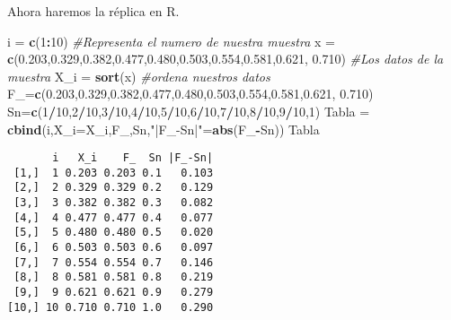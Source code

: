 \documentclass[
  a4paper,
  oneside,
  openany]{book}
\newenvironment{Shaded}{\begin{snugshade}}{\end{snugshade}}
\newcommand{\AttributeTok}[1]{\textcolor[rgb]{0.13,0.29,0.53}{#1}}
\newcommand{\CommentTok}[1]{\textcolor[rgb]{0.56,0.35,0.01}{\textit{#1}}}
\newcommand{\DecValTok}[1]{\textcolor[rgb]{0.00,0.00,0.81}{#1}}
\newcommand{\FloatTok}[1]{\textcolor[rgb]{0.00,0.00,0.81}{#1}}
\newcommand{\FunctionTok}[1]{\textcolor[rgb]{0.13,0.29,0.53}{\textbf{#1}}}
\newcommand{\NormalTok}[1]{#1}
\newcommand{\OtherTok}[1]{\textcolor[rgb]{0.56,0.35,0.01}{#1}}
\newcommand{\SpecialCharTok}[1]{\textcolor[rgb]{0.81,0.36,0.00}{\textbf{#1}}}
\newcommand{\StringTok}[1]{\textcolor[rgb]{0.31,0.60,0.02}{#1}}
\begin{document}
Ahora haremos la réplica en R.

\begin{Shaded}
\begin{Highlighting}[]
\NormalTok{i }\OtherTok{=} \FunctionTok{c}\NormalTok{(}\DecValTok{1}\SpecialCharTok{:}\DecValTok{10}\NormalTok{) }\CommentTok{\#Representa el numero de nuestra muestra}
\NormalTok{x }\OtherTok{=} \FunctionTok{c}\NormalTok{(}\FloatTok{0.203}\NormalTok{,}\FloatTok{0.329}\NormalTok{,}\FloatTok{0.382}\NormalTok{,}\FloatTok{0.477}\NormalTok{,}\FloatTok{0.480}\NormalTok{,}\FloatTok{0.503}\NormalTok{,}\FloatTok{0.554}\NormalTok{,}\FloatTok{0.581}\NormalTok{,}\FloatTok{0.621}\NormalTok{, }\FloatTok{0.710}\NormalTok{) }\CommentTok{\#Los datos de la muestra}
\NormalTok{X\_i }\OtherTok{=} \FunctionTok{sort}\NormalTok{(x) }\CommentTok{\#ordena nuestros datos}
\NormalTok{F\_}\OtherTok{=}\FunctionTok{c}\NormalTok{(}\FloatTok{0.203}\NormalTok{,}\FloatTok{0.329}\NormalTok{,}\FloatTok{0.382}\NormalTok{,}\FloatTok{0.477}\NormalTok{,}\FloatTok{0.480}\NormalTok{,}\FloatTok{0.503}\NormalTok{,}\FloatTok{0.554}\NormalTok{,}\FloatTok{0.581}\NormalTok{,}\FloatTok{0.621}\NormalTok{, }\FloatTok{0.710}\NormalTok{)}
\NormalTok{Sn}\OtherTok{=}\FunctionTok{c}\NormalTok{(}\DecValTok{1}\SpecialCharTok{/}\DecValTok{10}\NormalTok{,}\DecValTok{2}\SpecialCharTok{/}\DecValTok{10}\NormalTok{,}\DecValTok{3}\SpecialCharTok{/}\DecValTok{10}\NormalTok{,}\DecValTok{4}\SpecialCharTok{/}\DecValTok{10}\NormalTok{,}\DecValTok{5}\SpecialCharTok{/}\DecValTok{10}\NormalTok{,}\DecValTok{6}\SpecialCharTok{/}\DecValTok{10}\NormalTok{,}\DecValTok{7}\SpecialCharTok{/}\DecValTok{10}\NormalTok{,}\DecValTok{8}\SpecialCharTok{/}\DecValTok{10}\NormalTok{,}\DecValTok{9}\SpecialCharTok{/}\DecValTok{10}\NormalTok{,}\DecValTok{1}\NormalTok{)}
\NormalTok{Tabla }\OtherTok{=} \FunctionTok{cbind}\NormalTok{(i,}\AttributeTok{X\_i=}\NormalTok{X\_i,F\_,Sn,}\StringTok{"|F\_{-}Sn|"}\OtherTok{=}\FunctionTok{abs}\NormalTok{(F\_}\SpecialCharTok{{-}}\NormalTok{Sn))}
\NormalTok{Tabla}
\end{Highlighting}
\end{Shaded}

\begin{verbatim}
       i   X_i    F_  Sn |F_-Sn|
 [1,]  1 0.203 0.203 0.1   0.103
 [2,]  2 0.329 0.329 0.2   0.129
 [3,]  3 0.382 0.382 0.3   0.082
 [4,]  4 0.477 0.477 0.4   0.077
 [5,]  5 0.480 0.480 0.5   0.020
 [6,]  6 0.503 0.503 0.6   0.097
 [7,]  7 0.554 0.554 0.7   0.146
 [8,]  8 0.581 0.581 0.8   0.219
 [9,]  9 0.621 0.621 0.9   0.279
[10,] 10 0.710 0.710 1.0   0.290
\end{verbatim}
\end{document}
